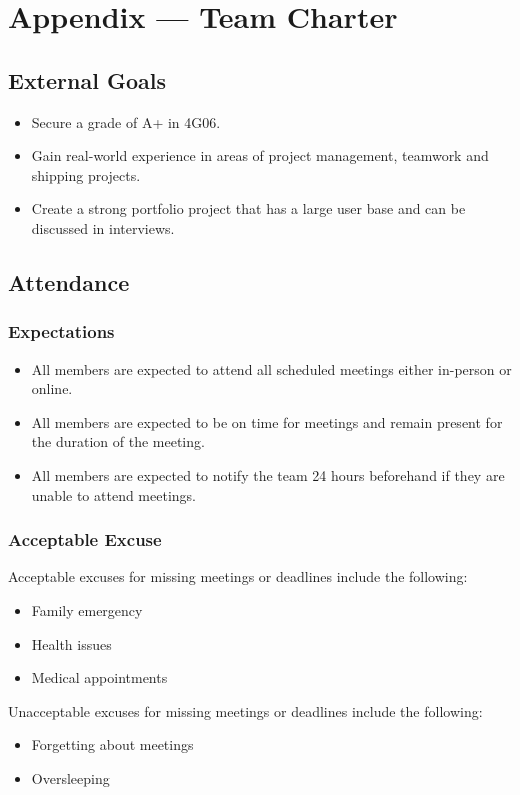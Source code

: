 \documentclass{article}
\begin{document}
\newpage{}

\section*{Appendix --- Team Charter}

\subsection*{External Goals}
\begin{itemize}
    \item Secure a grade of A+ in 4G06.
    \item Gain real-world experience in areas of project management, teamwork and shipping projects.
    \item Create a strong portfolio project that has a large user base and can be discussed in interviews.  
\end{itemize}


\subsection*{Attendance}

\subsubsection*{Expectations}
\begin{itemize}
    \item All members are expected to attend all scheduled meetings either in-person or online.
    \item All members are expected to be on time for meetings and remain present for the duration of the meeting.
    \item All members are expected to notify the team 24 hours beforehand if they are unable to attend meetings.
\end{itemize}

\subsubsection*{Acceptable Excuse}
Acceptable excuses for missing meetings or deadlines include the following:
\begin{itemize}
    \item Family emergency
    \item Health issues
    \item Medical appointments
\end{itemize}
Unacceptable excuses for missing meetings or deadlines include the following:
\begin{itemize}
    \item Forgetting about meetings
    \item Oversleeping
\end{itemize}
\end{document}
